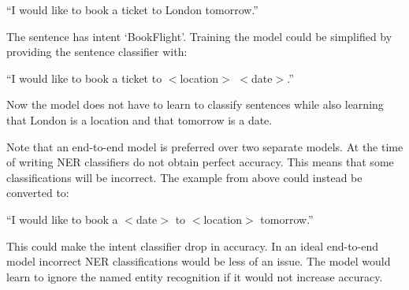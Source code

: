 \begin{center}
    ``I would like to book a ticket to London tomorrow.''
\end{center}

The sentence has intent `BookFlight'.
Training the model could be simplified by providing the sentence classifier with:

\begin{center}
    ``I would like to book a ticket to $<$location$>$ $<$date$>$.''
\end{center}

Now the model does not have to learn to classify sentences while also learning that London is a location and that tomorrow is a date.

Note that an end-to-end model is preferred over two separate models.
At the time of writing NER classifiers do not obtain perfect accuracy.
This means that some classifications will be incorrect.
The example from above could instead be converted to:

\begin{center}
    ``I would like to book a $<$date$>$ to $<$location$>$ tomorrow.''
\end{center}

This could make the intent classifier drop in accuracy.
In an ideal end-to-end model incorrect NER classifications would be less of an issue.
The model would learn to ignore the named entity recognition if it would not increase accuracy.


